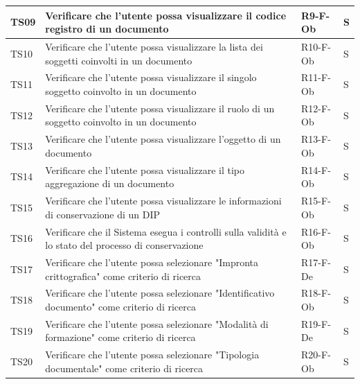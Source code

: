 \documentclass[a4paper,12pt]{article}
\begin{document}
\begin{longtable}{|M{1.2cm}|M{6.3cm}|M{2.5cm}|M{1.5cm}|}
                TS09 & Verificare che l’utente possa visualizzare il codice registro di un documento & R9-F-Ob & S \\
                \hline

                TS10 & Verificare che l’utente possa visualizzare la lista dei soggetti coinvolti in un documento & R10-F-Ob & S \\
                \hline

                TS11 & Verificare che l’utente possa visualizzare il singolo soggetto coinvolto in un documento & R11-F-Ob & S \\
                \hline

                TS12 & Verificare che l’utente possa visualizzare il ruolo di un soggetto coinvolto in un documento & R12-F-Ob & S \\
                \hline

                TS13 & Verificare che l'utente possa visualizzare l’oggetto di un documento & R13-F-Ob & S \\
                \hline

                TS14 & Verificare che l'utente possa visualizzare il tipo aggregazione di un documento & R14-F-Ob & S \\
                \hline

                TS15 & Verificare che l'utente possa visualizzare le informazioni di conservazione di un DIP & R15-F-Ob & S \\
                \hline

                TS16 & Verificare che il Sistema esegua i controlli sulla validità e lo stato del processo di conservazione & R16-F-Ob & S \\
                \hline

                TS17 & Verificare che l'utente possa selezionare "Impronta crittografica" come criterio di ricerca & R17-F-De & S \\
                \hline

                TS18 & Verificare che l'utente possa selezionare "Identificativo documento" come criterio di ricerca & R18-F-Ob & S \\
                \hline

                TS19 & Verificare che l'utente possa selezionare "Modalità di formazione" come criterio di ricerca & R19-F-De & S \\
                \hline

                TS20 & Verificare che l'utente possa selezionare "Tipologia documentale" come criterio di ricerca & R20-F-Ob & S \\
                \hline


\end{longtable}
\end{document}

